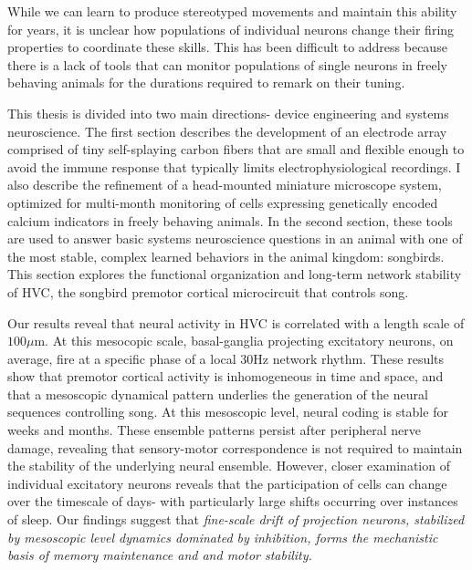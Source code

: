 
While we can learn to produce stereotyped movements and maintain this ability for years, it is unclear how populations of individual neurons change their firing properties to coordinate these skills. This has been difficult to address because there is a lack of tools that can monitor populations of single neurons in freely behaving animals for the durations required to remark on their tuning. 

This thesis is divided into two main directions- device engineering and systems neuroscience. The first section describes the development of an electrode array comprised of tiny self-splaying carbon fibers that are small and flexible enough to avoid the immune response that typically limits electrophysiological recordings. I also describe the refinement of a head-mounted miniature microscope system, optimized for multi-month monitoring of cells expressing genetically encoded calcium indicators in freely behaving animals. In the second section, these tools are used to answer basic systems neuroscience questions in an animal with one of the most stable, complex learned behaviors in the animal kingdom: songbirds. This section explores the functional organization and long-term network stability of HVC, the songbird premotor cortical microcircuit that controls song. 

Our results reveal that neural activity in HVC is correlated with a length scale of $100\mu$m. At this mesocopic scale, basal-ganglia projecting excitatory neurons, on average, fire at a specific phase of a local 30Hz network rhythm. These results show that premotor cortical activity is inhomogeneous in time and space, and that a mesoscopic dynamical pattern underlies the generation of the neural sequences controlling song.  At this mesoscopic level, neural coding is stable for weeks and months. These ensemble patterns persist after peripheral nerve damage, revealing that sensory-motor correspondence is not required to maintain the stability of the underlying neural ensemble. However, closer examination of individual excitatory neurons reveals that the participation of cells can change over the timescale of days- with particularly large shifts occurring over instances of sleep. Our findings suggest that  \emph{fine-scale drift of projection neurons, stabilized by mesoscopic level dynamics dominated by inhibition, forms the mechanistic basis of memory maintenance and and motor stability.} 

